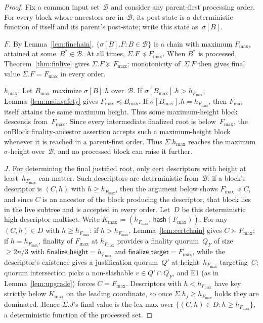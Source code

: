 \ifx\litemode\undefined\documentclass{article}\fi
\newcommand{\finalizeHeight}{\mathsf{finalize\_height}}
\newcommand{\finalizeTarget}{\mathsf{finalize\_target}}
\newcommand{\hash}{\mathsf{hash}}
\newcommand{\hmax}{\ensuremath{h_{\max}}\xspace}
\newcommand{\onBlock}{\textsf{onBlock}\xspace}
\theoremstyle{plain}
\theoremstyle{definition}
\theoremstyle{remark}
\begin{document}
\begin{proof}
Fix a common input set~$\mathcal B$ and consider any parent-first processing order.
For every block whose ancestors are in~$\mathcal B$, its post-state is a deterministic function of itself and its parent's post-state; write this state as~$\sigma[B]$.

\emph{$F$.} By Lemma~\ref{lem:finchain}, $\{\sigma[B].F : B \in \mathcal B\}$ is a chain with maximum $F_{\max}$, attained at some~$B^\ast \in \mathcal B$.
At all times, $\Sigma.F \preceq F_{\max}$.
When $B^\ast$ is processed, Theorem~\ref{thm:finlive} gives $\Sigma.F \succeq F_{\max}$; monotonicity of~$\Sigma.F$ then gives final value $\Sigma.F=F_{\max}$ in every order.

\emph{$\hmax$.} Let $B_{\max}$ maximize $\sigma[B].h$ over~$\mathcal B$.
If $\sigma[B_{\max}].h > h_{F_{\max}}$, Lemma~\ref{lem:mainsafety} gives $F_{\max} \preceq B_{\max}$.
If $\sigma[B_{\max}].h = h_{F_{\max}}$, then $F_{\max}$ itself attains the same maximum height.
Thus some maximum-height block descends from~$F_{\max}$.
Since every intermediate finalized root is below~$F_{\max}$, the \onBlock finality-ancestor assertion accepts such a maximum-height block whenever it is reached in a parent-first order.
Thus $\Sigma.\hmax$ reaches the maximum $\sigma$-height over~$\mathcal B$, and no processed block can raise it further.

\emph{$J$.} For determining the final justified root, only cert descriptors with height at least~$h_{F_{\max}}$ can matter.
Such descriptors are deterministic from~$\mathcal B$: if a block's descriptor is $(C,h)$ with $h\geq h_{F_{\max}}$, then the argument below shows $F_{\max}\preceq C$, and since $C$ is an ancestor of the block producing the descriptor, that block lies in the live subtree and is accepted in every order.
Let~$D$ be this deterministic high-descriptor multiset.
Write $K_{\max} \coloneqq (h_{F_{\max}},\, \hash(F_{\max}))$.
For any $(C, h) \in D$ with $h \geq h_{F_{\max}}$: if $h > h_{F_{\max}}$, Lemma~\ref{lem:certchain} gives $C \succ F_{\max}$; if $h = h_{F_{\max}}$, finality of $F_{\max}$ at $h_{F_{\max}}$ provides a finality quorum~$Q_F$ of size $\geq 2n/3$ with $\finalizeHeight = h_{F_{\max}}$ and $\finalizeTarget = F_{\max}$, while the descriptor's existence gives a justification quorum~$Q'$ at height~$h_{F_{\max}}$ targeting~$C$; quorum intersection picks a non-slashable $v \in Q' \cap Q_F$, and E1 (as in Lemma~\ref{lem:upgrade}) forces $C = F_{\max}$.
Descriptors with $h < h_{F_{\max}}$ have key strictly below $K_{\max}$ on the leading coordinate, so once $\Sigma.h_j \geq h_{F_{\max}}$ holds they are dominated.
Hence $\Sigma.J$'s final value is the lex-max over $\{(C, h) \in D : h \geq h_{F_{\max}}\}$, a deterministic function of the processed set.


\end{proof}
\end{document}
